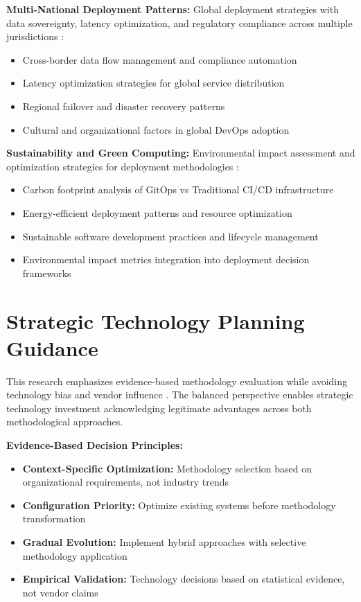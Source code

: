 \textbf{Multi-National Deployment Patterns:} Global deployment strategies with data sovereignty, latency optimization, and regulatory compliance across multiple jurisdictions \cite{global_deployment,data_sovereignty}:
\begin{itemize}
\item Cross-border data flow management and compliance automation
\item Latency optimization strategies for global service distribution
\item Regional failover and disaster recovery patterns
\item Cultural and organizational factors in global DevOps adoption
\end{itemize}

\textbf{Sustainability and Green Computing:} Environmental impact assessment and optimization strategies for deployment methodologies \cite{green_computing,sustainable_software}:
\begin{itemize}
\item Carbon footprint analysis of GitOps vs Traditional CI/CD infrastructure
\item Energy-efficient deployment patterns and resource optimization
\item Sustainable software development practices and lifecycle management
\item Environmental impact metrics integration into deployment decision frameworks
\end{itemize}

\section{Strategic Technology Planning Guidance}
\label{sec:strategic_guidance}

This research emphasizes evidence-based methodology evaluation while avoiding technology bias and vendor influence \cite{evidence_based_technology_decisions,vendor_neutral_evaluation}. The balanced perspective enables strategic technology investment acknowledging legitimate advantages across both methodological approaches.

\textbf{Evidence-Based Decision Principles:}
\begin{itemize}
\item \textbf{Context-Specific Optimization:} Methodology selection based on organizational requirements, not industry trends \cite{context_driven_decisions}
\item \textbf{Configuration Priority:} Optimize existing systems before methodology transformation \cite{optimization_first_approach}
\item \textbf{Gradual Evolution:} Implement hybrid approaches with selective methodology application \cite{incremental_transformation}
\item \textbf{Empirical Validation:} Technology decisions based on statistical evidence, not vendor claims \cite{data_driven_decisions}
\end{itemize}

